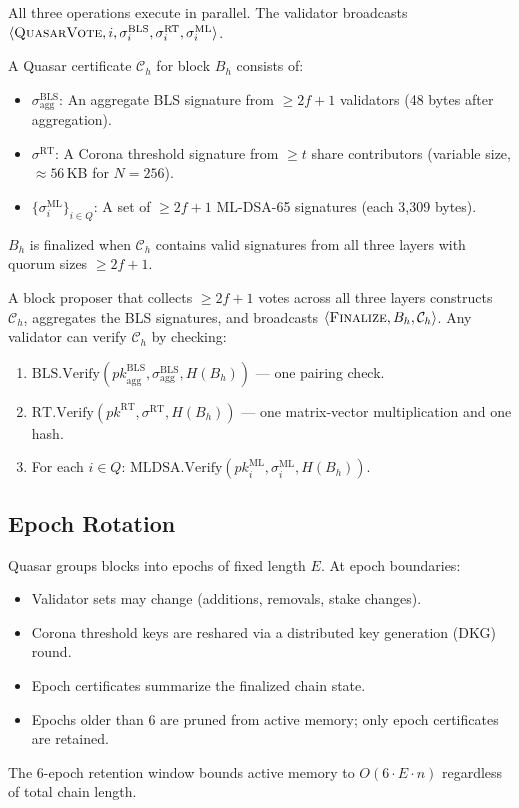 All three operations execute in parallel. The validator broadcasts
$\langle \textsc{QuasarVote}, i, \sigma_i^{\mathrm{BLS}},
\sigma_i^{\mathrm{RT}}, \sigma_i^{\mathrm{ML}} \rangle$.

\begin{definition}
A Quasar certificate $\mathcal{C}_h$ for block $B_h$ consists of:
\begin{itemize}[leftmargin=2em]
\item $\sigma^{\mathrm{BLS}}_{\mathrm{agg}}$: An aggregate BLS signature from
      $\geq 2f+1$ validators (48 bytes after aggregation).
\item $\sigma^{\mathrm{RT}}$: A Corona threshold signature from $\geq t$
      share contributors (variable size, $\approx 56$\,KB for $N=256$).
\item $\{\sigma_i^{\mathrm{ML}}\}_{i \in Q}$: A set of $\geq 2f+1$ ML-DSA-65
      signatures (each 3{,}309 bytes).
\end{itemize}
$B_h$ is finalized when $\mathcal{C}_h$ contains valid signatures from all
three layers with quorum sizes $\geq 2f+1$.
\end{definition}

A block proposer that collects $\geq 2f+1$ votes across all three layers
constructs $\mathcal{C}_h$, aggregates the BLS signatures, and broadcasts
$\langle \textsc{Finalize}, B_h, \mathcal{C}_h \rangle$. Any validator
can verify $\mathcal{C}_h$ by checking:
\begin{enumerate}[leftmargin=2em]
\item $\mathrm{BLS.Verify}(\mathit{pk}^{\mathrm{BLS}}_{\mathrm{agg}},
      \sigma^{\mathrm{BLS}}_{\mathrm{agg}}, H(B_h))$ --- one pairing check.
\item $\mathrm{RT.Verify}(\mathit{pk}^{\mathrm{RT}}, \sigma^{\mathrm{RT}},
      H(B_h))$ --- one matrix-vector multiplication and one hash.
\item For each $i \in Q$: $\mathrm{MLDSA.Verify}(\mathit{pk}_i^{\mathrm{ML}},
      \sigma_i^{\mathrm{ML}}, H(B_h))$.
\end{enumerate}

\subsection{Epoch Rotation}

Quasar groups blocks into epochs of fixed length $E$. At epoch boundaries:
\begin{itemize}[leftmargin=2em]
\item Validator sets may change (additions, removals, stake changes).
\item Corona threshold keys are reshared via a distributed key generation
      (DKG) round.
\item Epoch certificates summarize the finalized chain state.
\item Epochs older than 6 are pruned from active memory; only epoch
      certificates are retained.
\end{itemize}
The 6-epoch retention window bounds active memory to $O(6 \cdot E \cdot n)$
regardless of total chain length.



